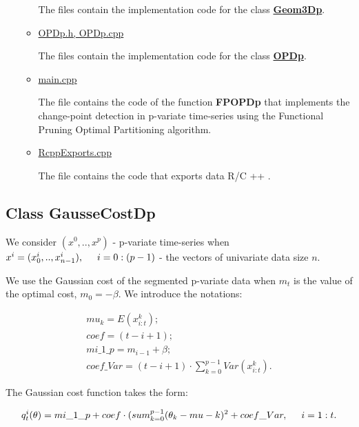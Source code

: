 \documentclass{report}
\begin{document}
\begin{itemize}
\begin{itemize}
			The files contain the implementation code for the class \hyperref [Geom3Dp]{\bfseries Geom3Dp}. 
			
			\item \underline{OPDp.h, OPDp.cpp}
			
			The files contain the implementation code for the class \hyperref [OPDp]{\bfseries OPDp}. 
			
			\item \underline{main.cpp}
			
			The file contains the code of the function {\bfseries FPOPDp} that implements the change-point detection in p-variate time-series using the Functional Pruning Optimal Partitioning algorithm.
			
			\item \underline{RcppExports.cpp} 
			
			The file contains the code that exports data R/C ++ .	
		\end{itemize}
	\end{itemize}

\newpage
	\subsection*{Class  GausseCostDp}
	\label{GausseCostDp}
	
	We consider $(x^0,.., x^p)$ - p-variate time-series when $x^i = (x_0^i,..,x_{n-1}^i), \hspace*{5mm} i = 0:(p-1)$ - the vectors of univariate data size $n$.
	
	We use the Gaussian cost of the segmented p-variate data when $m_{t}$ is the value of the optimal cost, $m_{0} = -\beta $.
	We introduce the notations:
	
	\begin{equation}
		\begin{gathered}
			mu_k = E(x_{i:t}^k);\\
			coef = (t - i + 1);\\
			mi\_1\_p = m_{i-1} + \beta;\\
			coef\_Var = (t-i+1)\cdot\sum_{k = 0}^{p-1}Var(x_{i:t}^k).
		\end{gathered}
		\label{eq:coef}
	\end{equation}
	
	The Gaussian cost function  takes the form:
	
	\begin{equation}
		q_t^i(\theta) = mi\_1\_p+ coef\cdot(sum_{k = 0}^{p-1}(\theta_k - mu-k)^2 + coef\_Var, \hspace*{5mm} i = 1:t.
		\label{eq:costcoef}
	\end{equation}
	
\end{document}
